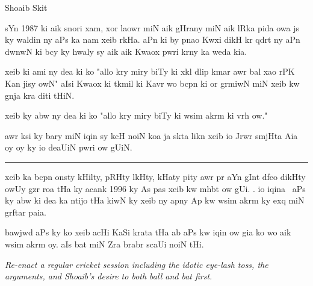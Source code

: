 \documentclass{article}
\begin{document}
\begin{center} \LARGE
	Shoaib Skit
\end{center}

\startUrdu

	sYn 1987 ki aik snori xam, xor laowr miN aik gHrany miN aik lRka pida owa js ky waldin ny aPs ka nam xeib rkHa.
	aPn ki by pnao Kwxi dikH kr qdrt ny aPn dwnwN ki bcy ky hwaly sy aik aik Kwaox pwri krny ka weda kia.


	xeib ki ami ny dea ki ko "allo kry miry biTy ki xkl dlip kmar awr bal xao rPK Kan jisy owN" aIsi Kwaox ki tkmil ki Kavr wo bcpn ki or grmiwN miN xeib kw gnja kra diti tHiN. \hfill {}

	xeib ky abw ny dea ki ko "allo kry miry biTy ki  wsim akrm ki vrh ow."

	awr ksi ky bary miN iqin sy kcH noiN koa ja skta likn xeib io Jrwr smjHta Aia oy oy ky io deaUiN pwri ow gUiN.

\rule{\textwidth}{1pt}

	xeib ka bcpn onsty kHilty, pRHty lkHty,  kHaty pity awr  pr aYn gInt dfeo  dikHty owUy gzr roa tHa ky acank 1996 ky As pas xeib kw mhbt ow gUi.
	.
	io iqina~ aPs ky abw ki dea ka ntijo tHa kiwN ky xeib ny apny Ap kw wsim akrm ky exq miN grftar paia.

	bawjwd aPs ky ko xeib acHi KaSi  krata tHa ab aPs kw iqin ow gia ko wo aik  wsim akrm oy.
	aIs bat miN Zra brabr scaUi noiN tHi.

\begin{enpara}
	\itshape
	Re-enact a regular cricket session including the idotic eye-lash toss, the arguments, and Shoaib's desire to both ball and bat first.
\end{enpara}

	\vspace{0\baselineskip}
	\begin{itemize}
	\end{itemize}
\end{document}

